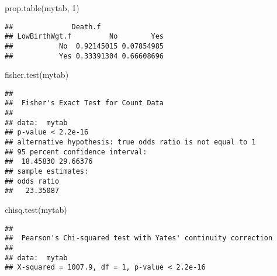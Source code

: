 \documentclass[
]{article}
\newenvironment{Shaded}{\begin{snugshade}}{\end{snugshade}}
\newcommand{\AttributeTok}[1]{\textcolor[rgb]{0.77,0.63,0.00}{#1}}
\newcommand{\ConstantTok}[1]{\textcolor[rgb]{0.00,0.00,0.00}{#1}}
\newcommand{\DecValTok}[1]{\textcolor[rgb]{0.00,0.00,0.81}{#1}}
\newcommand{\FunctionTok}[1]{\textcolor[rgb]{0.00,0.00,0.00}{#1}}
\newcommand{\NormalTok}[1]{#1}
\newcommand{\OtherTok}[1]{\textcolor[rgb]{0.56,0.35,0.01}{#1}}
\newcommand{\SpecialCharTok}[1]{\textcolor[rgb]{0.00,0.00,0.00}{#1}}
\newcommand{\StringTok}[1]{\textcolor[rgb]{0.31,0.60,0.02}{#1}}
\begin{document}
\begin{Shaded}
\begin{Highlighting}[]
\FunctionTok{prop.table}\NormalTok{(mytab, }\DecValTok{1}\NormalTok{)}
\end{Highlighting}
\end{Shaded}

\begin{verbatim}
##              Death.f
## LowBirthWgt.f         No        Yes
##           No  0.92145015 0.07854985
##           Yes 0.33391304 0.66608696
\end{verbatim}

\begin{Shaded}
\begin{Highlighting}[]
\FunctionTok{fisher.test}\NormalTok{(mytab)}
\end{Highlighting}
\end{Shaded}

\begin{verbatim}
## 
##  Fisher's Exact Test for Count Data
## 
## data:  mytab
## p-value < 2.2e-16
## alternative hypothesis: true odds ratio is not equal to 1
## 95 percent confidence interval:
##  18.45830 29.66376
## sample estimates:
## odds ratio 
##   23.35087
\end{verbatim}

\begin{Shaded}
\begin{Highlighting}[]
\FunctionTok{chisq.test}\NormalTok{(mytab)}
\end{Highlighting}
\end{Shaded}

\begin{verbatim}
## 
##  Pearson's Chi-squared test with Yates' continuity correction
## 
## data:  mytab
## X-squared = 1007.9, df = 1, p-value < 2.2e-16
\end{verbatim}

\begin{Shaded}
\end{Shaded}
\end{document}

